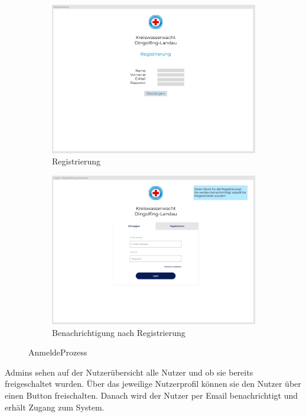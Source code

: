\documentclass[fontsize=12pt,openright,oneside,paper=a4,BCOR=1cm]{scrbook}
\begin{document}
\begin{figure}[h!]
  \centering
  \begin{subfigure}[b]{0.4\linewidth}
    \includegraphics[width=\linewidth]{Anlagen/Figma/2-Registrierung.png}
    \caption{Registrierung}
  \end{subfigure}
  \begin{subfigure}[b]{0.4\linewidth}
    \includegraphics[width=\linewidth]{Anlagen/Figma/3-LoginSuccess.png}
    \caption{Benachrichtigung nach Registrierung}
  \end{subfigure}
  \caption{AnmeldeProzess}
  \label{fig:anmeldeprozess}
\end{figure}

Admins sehen auf der Nutzerübersicht alle Nutzer und ob sie bereits freigeschaltet wurden. Über das jeweilige Nutzerprofil können sie den Nutzer über einen Button freischalten. Danach wird der Nutzer per Email benachrichtigt und erhält Zugang zum System. \\
\end{document}
